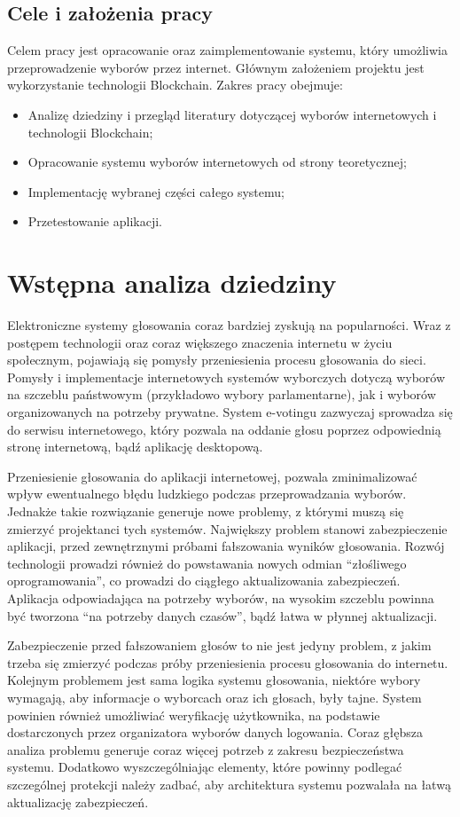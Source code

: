 \documentclass[a4paper,12pt]{book}
\begin{document}
\section{Cele i założenia pracy}

Celem pracy jest opracowanie oraz zaimplementowanie systemu, który umożliwia przeprowadzenie wyborów przez internet. Głównym założeniem projektu jest wykorzystanie technologii Blockchain. Zakres pracy obejmuje:

\begin{itemize}
	\item Analizę dziedziny i przegląd literatury dotyczącej wyborów internetowych i technologii Blockchain;
	\item Opracowanie systemu wyborów internetowych od strony teoretycznej;
	\item Implementację wybranej części całego systemu;
	\item Przetestowanie aplikacji.
\end{itemize}

\chapter{Wstępna analiza dziedziny}
Elektroniczne systemy głosowania coraz bardziej zyskują na popularności.
Wraz z postępem technologii oraz coraz większego znaczenia internetu w życiu 
społecznym, pojawiają się pomysły przeniesienia procesu głosowania do sieci. Pomysły i implementacje internetowych systemów wyborczych dotyczą wyborów na szczeblu państwowym (przykładowo wybory parlamentarne), jak i wyborów organizowanych na potrzeby prywatne. System e-votingu zazwyczaj sprowadza się do serwisu internetowego, który pozwala na oddanie głosu poprzez odpowiednią stronę internetową, bądź aplikację desktopową. 

Przeniesienie głosowania do aplikacji internetowej, pozwala zminimalizować wpływ ewentualnego błędu ludzkiego podczas przeprowadzania wyborów. Jednakże takie rozwiązanie generuje nowe problemy, z którymi muszą się zmierzyć projektanci tych systemów. Największy problem stanowi zabezpieczenie aplikacji, przed zewnętrznymi próbami fałszowania wyników głosowania. Rozwój technologii prowadzi również do powstawania nowych odmian “złośliwego oprogramowania”, co prowadzi do ciągłego aktualizowania zabezpieczeń. Aplikacja odpowiadająca na potrzeby wyborów, na wysokim szczeblu powinna być tworzona “na potrzeby danych czasów”, bądź łatwa w płynnej aktualizacji.

Zabezpieczenie przed fałszowaniem głosów to nie jest jedyny problem, z jakim trzeba się zmierzyć podczas próby przeniesienia procesu głosowania do internetu. Kolejnym problemem jest sama logika systemu głosowania, niektóre wybory wymagają, aby informacje o wyborcach oraz ich głosach, były tajne. System powinien również umożliwiać weryfikację użytkownika, na podstawie dostarczonych przez organizatora wyborów danych logowania. Coraz głębsza analiza problemu generuje coraz więcej potrzeb z zakresu bezpieczeństwa systemu. Dodatkowo wyszczególniając elementy, które powinny podlegać szczególnej protekcji należy zadbać, aby architektura systemu pozwalała na łatwą aktualizację zabezpieczeń.
\end{document}
